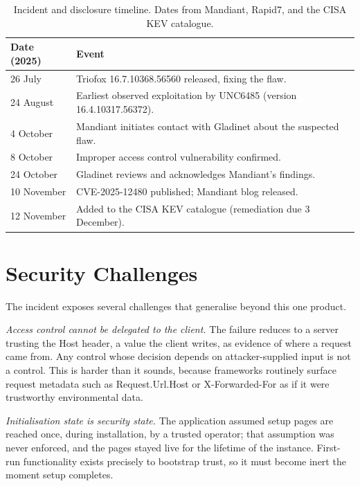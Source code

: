\documentclass[11pt,a4paper]{article}
\newcommand{\code}[1]{{\small\ttfamily #1}}
\begin{document}
\begin{table}[htbp]
\centering
\caption{Incident and disclosure timeline. Dates from Mandiant, Rapid7, and the CISA KEV catalogue.}
\label{tab:timeline}
\small
\begin{tabularx}{\textwidth}{p{} X}
\toprule
\rowcolor{headergrey}\textbf{Date (2025)} & \textbf{Event} \\
\midrule
26 July & Triofox 16.7.10368.56560 released, fixing the flaw. \\
24 August & Earliest observed exploitation by UNC6485 (version 16.4.10317.56372). \\
4 October & Mandiant initiates contact with Gladinet about the suspected flaw. \\
8 October & Improper access control vulnerability confirmed. \\
24 October & Gladinet reviews and acknowledges Mandiant's findings. \\
10 November & CVE-2025-12480 published; Mandiant blog released. \\
12 November & Added to the CISA KEV catalogue (remediation due 3 December). \\
\bottomrule
\end{tabularx}
\end{table}

\section{Security Challenges}

The incident exposes several challenges that generalise beyond this one product.

\textit{Access control cannot be delegated to the client.} The failure reduces to a server trusting the \code{Host} header, a value the client writes, as evidence of where a request came from. Any control whose decision depends on attacker-supplied input is not a control. This is harder than it sounds, because frameworks routinely surface request metadata such as \code{Request.Url.Host} or \code{X-Forwarded-For} as if it were trustworthy environmental data.

\textit{Initialisation state is security state.} The application assumed setup pages are reached once, during installation, by a trusted operator; that assumption was never enforced, and the pages stayed live for the lifetime of the instance. First-run functionality exists precisely to bootstrap trust, so it must become inert the moment setup completes.
\end{document}
